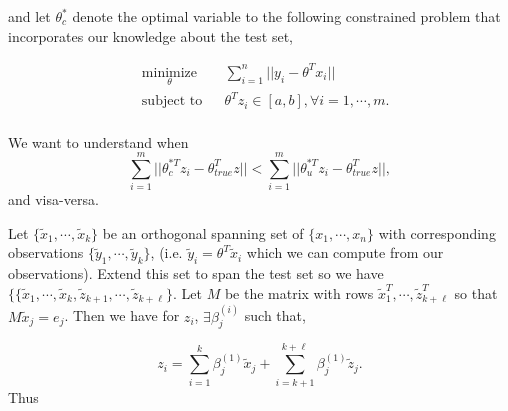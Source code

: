 \documentclass[12pt]{article}
\begin{document}
and let  $\theta^{*}_{c}$ denote the optimal variable to the following constrained problem that incorporates our knowledge about the test set,

\begin{equation}
\label{original} 
\begin{aligned}
& \underset{\theta}{\text{minimize}}
& & \sum \limits_{i=1}^{n} \lvert \lvert y_{i} - \theta^{T}x_{i} \lvert \lvert \\
& \text{subject to}
& & \theta^{T}z_{i} \in [a,b], \forall i = 1, \cdots, m.\\
\end{aligned}
\end{equation}
 
 We want to understand when 
 \begin{equation*}
 \sum \limits_{i=1}^{m} \lvert \lvert \theta_{c}^{*T}z_{i} - \theta_{true}^{T}z \lvert \lvert < \sum \limits_{i=1}^{m} \lvert \lvert \theta_{u}^{*T}z_{i} - \theta_{true}^{T}z \lvert \lvert,
 \end{equation*} 
 and visa-versa. 

Let $\{\tilde{x}_{1}, \cdots, \tilde{x}_{k}\}$ be an orthogonal spanning set of $\{x_{1}, \cdots, x_{n} \}$ with corresponding observations $\{\tilde{y}_{1}, \cdots, \tilde{y}_{k} \}$, (i.e. $\tilde{y}_{i} = \theta^{T}\tilde{x}_{i}$ which we can compute from our observations). Extend this set to span the test set so we have $\{ \{\tilde{x}_{1}, \cdots, \tilde{x}_{k}, \tilde{z}_{k+1}, \cdots, \tilde{z}_{k+ \ell}\}$. Let $M$ be the matrix with rows $\tilde{x}_{1}^{T}, \cdots, \tilde{z}_{k+ \ell}^{T}$ so that $M\tilde{x}_{j} = e_{j}$. Then we have for $z_{i}$, $\exists \beta^{(i)}_{j}$ such that,

\begin{equation*}
z_{i} = \sum \limits_{i=1}^{k} \beta_{j}^{(1)} \tilde{x}_{j} + \sum \limits_{i=k+1}^{k + \ell} \beta_{j}^{(1)} \tilde{z}_{j}.
\end{equation*}
Thus 
\end{document}
